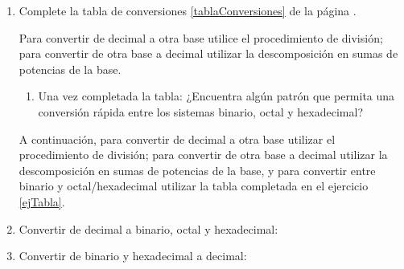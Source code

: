 \documentclass[12pt]{article}
\begin{document}
\begin{enumerate}

    \item Complete la tabla de conversiones \ref{tablaConversiones} de la
        página \pageref{tablaConversiones}. \label{ejTabla}

        Para convertir de decimal a otra base utilice el procedimiento de
        división; para convertir de otra base a decimal utilizar la
        descomposición en sumas de potencias de la base.

        \begin{enumerate}

            \item Una vez completada la tabla: ¿Encuentra algún patrón que
                permita una conversión rápida entre los sistemas binario,
                octal y hexadecimal?

        \end{enumerate}

        A continuación, para convertir de decimal a otra base utilizar el
        procedimiento de división; para convertir de otra base a decimal
        utilizar la descomposición en sumas de potencias de la base, y para
        convertir entre binario y octal/hexadecimal utilizar la tabla
        completada en el ejercicio \ref{ejTabla}.

    \item Convertir de decimal a binario, octal y hexadecimal:


    \item Convertir de binario y hexadecimal a decimal:

\end{enumerate}
\end{document}
